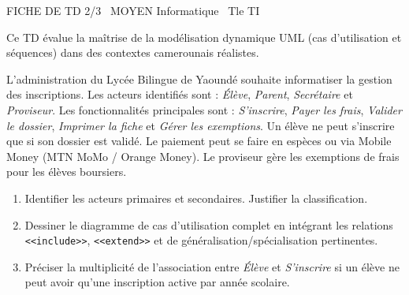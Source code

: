 \documentclass[11pt]{article}
\begin{document}
\begin{tcolorbox}[enhanced,colback=popink,colframe=popink,arc=10pt,boxrule=0pt,left=12pt,right=12pt,top=9pt,bottom=9pt]
{\color{white}\popxbold\small FICHE DE TD 2/3 \textbullet\ MOYEN \hfill Informatique \textbullet\ Tle TI\par}
\end{tcolorbox}
\vspace{4pt}
Ce TD évalue la maîtrise de la modélisation dynamique UML (cas d'utilisation et séquences) dans des contextes camerounais réalistes.

\begin{exercice}
L'administration du Lycée Bilingue de Yaoundé souhaite informatiser la gestion des inscriptions. Les acteurs identifiés sont : \textit{Élève}, \textit{Parent}, \textit{Secrétaire} et \textit{Proviseur}. Les fonctionnalités principales sont : \textit{S'inscrire}, \textit{Payer les frais}, \textit{Valider le dossier}, \textit{Imprimer la fiche} et \textit{Gérer les exemptions}. Un élève ne peut s'inscrire que si son dossier est validé. Le paiement peut se faire en espèces ou via Mobile Money (MTN MoMo / Orange Money). Le proviseur gère les exemptions de frais pour les élèves boursiers.
\begin{enumerate}
    \item Identifier les acteurs primaires et secondaires. Justifier la classification.
    \item Dessiner le diagramme de cas d'utilisation complet en intégrant les relations \texttt{<<include>>}, \texttt{<<extend>>} et de généralisation/spécialisation pertinentes.
    \item Préciser la multiplicité de l'association entre \textit{Élève} et \textit{S'inscrire} si un élève ne peut avoir qu'une inscription active par année scolaire.
\end{enumerate}
\end{exercice}
\end{document}
